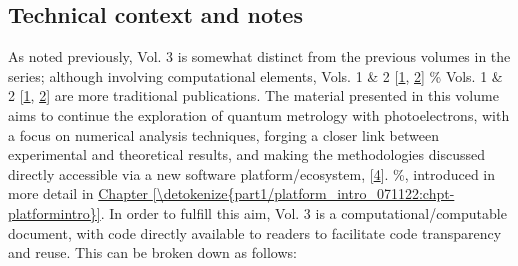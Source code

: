 \documentclass[letterpaper,table,10pt,english]{jupyterBook}
\begin{document}
\subsection{Technical context and notes}
\label{\detokenize{part1/main_intro_051122:technical-context-and-notes}}
\sphinxAtStartPar
As noted previously, Vol. 3 is somewhat distinct from the previous volumes in the series; although involving computational elements,  Vols. 1 \& 2 {[}\hyperlink{cite.backmatter/bibliography:id613}{1}, \hyperlink{cite.backmatter/bibliography:id614}{2}{]} \% Vols. 1 \& 2 {[}\hyperlink{cite.backmatter/bibliography:id613}{1}, \hyperlink{cite.backmatter/bibliography:id614}{2}{]}
are more traditional publications. The material presented in this volume aims to continue the exploration of quantum metrology with photoelectrons, with a focus on numerical analysis techniques, forging a closer link between experimental and theoretical results, and making the methodologies discussed directly accessible via a new software platform/ecosystem,  {[}\hyperlink{cite.backmatter/bibliography:id618}{4}{]}. \%, introduced in more detail in \hyperref[\detokenize{part1/platform_intro_071122:chpt-platformintro}]{Chapter \ref{\detokenize{part1/platform_intro_071122:chpt-platformintro}}}.
In order to fulfill this aim, Vol. 3 is a computational/computable document, with code directly available to readers to facilitate code transparency and reuse. This can be broken down as follows:
\end{document}
